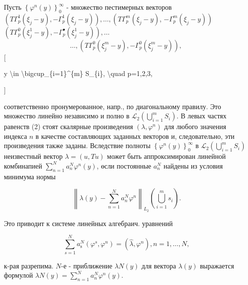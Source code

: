 \documentclass[10pt]{article}
\begin{document}
Пусть $\left\{\varphi^{n}(y)\right\}_{0}^{\infty}$ - множество пестимерных векторов $\left(T \Gamma_{p}^{1}\left(\xi_{j}-y\right),-\Gamma_{p}^{1}\left(\xi_{j}-y\right)\right), \ldots,\left(T \Gamma_{p}^{m}\left(\xi_{j}-y\right)\right.$, $\left.-\Gamma_{p}^{m}\left(\xi_{j}-y\right)\right)$ $\left(T \Gamma_{p}^{0}\left(\xi_{j}^{1}-y\right),-\Gamma_{p}^{\bullet}\left(\xi_{j}^{1}-y\right)\right), \ldots$\[

\ldots,\left(T \Gamma_{p}^{0}\left(\xi_{j}^{m}-y\right),-\Gamma_{p}^{0}\left(\xi_{j}^{m}-y\right)\right) \text {, }

\][



y \textbackslash in \textbackslash bigcup\_\{i=1\}\^{}\{m\} S\_\{i\}, \textbackslash quad p=1,2,3,

]



соответственно пронумерованное, напр., по диагональному правилу. Это множество линейно независимо и полно в $\mathscr{L}_{2}\left(\bigcup_{i=1}^{m} S_{i}\right)$. В левых частях равенств (2) стоят скалярные произведения $\left(\lambda, \varphi^{n}\right)$ для любого значения индекса $n$ в качестве составляющих заданных векторов и, следовательно, эти произведения также заданы. Вследствие полноты $\left\{\varphi^{n}(y)\right\}_{0}^{\infty}$ в $\mathscr{L}_{2}\left(\bigcup_{i=1}^{m} S_{i}\right)$ неизвестный вектор $\lambda=(u, T u)$ может быть аппроксимирован линейной комбинапией $\sum_{n=1}^{N} a_{n}^{N} \varphi^{n}(y)$, өсли постоянные $a_{n}^{N}$ найдены из условия минимума нормы



\[

\left\|\lambda(y)-\sum_{n=1}^{N} a_{n}^{N} \varphi^{n}\right\|_{L_{2}}\left(\bigcup_{i=1}^{m} s_{i}\right) .

\]



Это приводит к системе линейных алгебраич. уравнений



\[

\sum_{s=1}^{N} a_{\mathrm{s}}^{N}\left(\varphi^{s}, \varphi^{n}\right)=\left(\hat{\lambda}, \varphi^{n}\right), n=1, \ldots, N,

\]



к-рая разрепима. $N$-е - приближение $\lambda N(y)$ для вектора $\lambda(y)$ выражается формулой $\lambda N(y)=\sum_{n=1}^{N} a_{n}^{N} \varphi^{n}(y)$.
\end{document}
